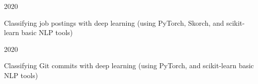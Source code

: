 

\begin{cvprojects}

  \cvproject
    {} %
    {} %
    {} %
    {2020} %
    {
      \begin{cvitems} %
        \item {Classifying job postings with deep learning (using PyTorch, Skorch, and scikit-learn basic NLP tools)}
      \end{cvitems}
    }

  \cvproject
    {} %
    {} %
    {} %
    {2020} %
    {
      \begin{cvitems} %
        \item {Classifying Git commits with deep learning (using PyTorch, and scikit-learn basic NLP tools)}
      \end{cvitems}
    }




\end{cvprojects}
